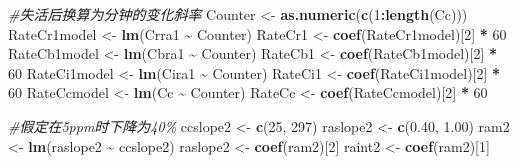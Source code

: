 \documentclass[
]{krantz}
\makeatletter
\newenvironment{Shaded}{\begin{snugshade}}{\end{snugshade}}
\newcommand{\CommentTok}[1]{\textcolor[rgb]{0.56,0.35,0.01}{\textit{#1}}}
\newcommand{\DecValTok}[1]{\textcolor[rgb]{0.00,0.00,0.81}{#1}}
\newcommand{\FloatTok}[1]{\textcolor[rgb]{0.00,0.00,0.81}{#1}}
\newcommand{\KeywordTok}[1]{\textcolor[rgb]{0.13,0.29,0.53}{\textbf{#1}}}
\newcommand{\NormalTok}[1]{#1}
\newcommand{\OperatorTok}[1]{\textcolor[rgb]{0.81,0.36,0.00}{\textbf{#1}}}
\newcommand{\StringTok}[1]{\textcolor[rgb]{0.31,0.60,0.02}{#1}}
\newenvironment{kframe}{%
\medskip{}
\setlength{\fboxsep}{.8em}
 \def\at@end@of@kframe{}%
 \ifinner\ifhmode%
  \def\at@end@of@kframe{\end{minipage}}%
  \begin{minipage}{\columnwidth}%
 \fi\fi%
 \def\FrameCommand##1{\hskip\@totalleftmargin \hskip-\fboxsep
 \colorbox{shadecolor}{##1}\hskip-\fboxsep
     \hskip-\linewidth \hskip-\@totalleftmargin \hskip\columnwidth}%
 \MakeFramed {\advance\hsize-\width
   \@totalleftmargin\z@ \linewidth\hsize
   \@setminipage}}%
 {\par\unskip\endMakeFramed%
 \at@end@of@kframe}
\renewenvironment{Shaded}{\begin{kframe}}{\end{kframe}}
\makeatother
\begin{document}
\begin{Shaded}
\begin{Highlighting}[]
\CommentTok{\#失活后换算为分钟的变化斜率}
\NormalTok{Counter \textless{}{-}}\StringTok{ }\KeywordTok{as.numeric}\NormalTok{(}\KeywordTok{c}\NormalTok{(}\DecValTok{1}\OperatorTok{:}\KeywordTok{length}\NormalTok{(Cc)))}
\NormalTok{RateCr1model \textless{}{-}}\StringTok{ }\KeywordTok{lm}\NormalTok{(Crra1 }\OperatorTok{\textasciitilde{}}\StringTok{ }\NormalTok{Counter)}
\NormalTok{RateCr1 \textless{}{-}}\StringTok{ }\KeywordTok{coef}\NormalTok{(RateCr1model)[}\DecValTok{2}\NormalTok{] }\OperatorTok{*}\StringTok{ }\DecValTok{60}
\NormalTok{RateCb1model \textless{}{-}}\StringTok{ }\KeywordTok{lm}\NormalTok{(Cbra1 }\OperatorTok{\textasciitilde{}}\StringTok{ }\NormalTok{Counter)}
\NormalTok{RateCb1 \textless{}{-}}\StringTok{ }\KeywordTok{coef}\NormalTok{(RateCb1model)[}\DecValTok{2}\NormalTok{] }\OperatorTok{*}\StringTok{ }\DecValTok{60}
\NormalTok{RateCi1model \textless{}{-}}\StringTok{ }\KeywordTok{lm}\NormalTok{(Cira1 }\OperatorTok{\textasciitilde{}}\StringTok{ }\NormalTok{Counter)}
\NormalTok{RateCi1 \textless{}{-}}\StringTok{ }\KeywordTok{coef}\NormalTok{(RateCi1model)[}\DecValTok{2}\NormalTok{] }\OperatorTok{*}\StringTok{ }\DecValTok{60}
\NormalTok{RateCcmodel \textless{}{-}}\StringTok{ }\KeywordTok{lm}\NormalTok{(Cc }\OperatorTok{\textasciitilde{}}\StringTok{ }\NormalTok{Counter)}
\NormalTok{RateCc \textless{}{-}}\StringTok{ }\KeywordTok{coef}\NormalTok{(RateCcmodel)[}\DecValTok{2}\NormalTok{] }\OperatorTok{*}\StringTok{ }\DecValTok{60}

\CommentTok{\#假定在5ppm时下降为40\%}
\NormalTok{ccslope2 \textless{}{-}}\StringTok{ }\KeywordTok{c}\NormalTok{(}\DecValTok{25}\NormalTok{, }\DecValTok{297}\NormalTok{)}
\NormalTok{raslope2 \textless{}{-}}\StringTok{ }\KeywordTok{c}\NormalTok{(}\FloatTok{0.40}\NormalTok{, }\FloatTok{1.00}\NormalTok{)}
\NormalTok{ram2 \textless{}{-}}\StringTok{ }\KeywordTok{lm}\NormalTok{(raslope2 }\OperatorTok{\textasciitilde{}}\StringTok{ }\NormalTok{ccslope2)}
\NormalTok{raslope2 \textless{}{-}}\StringTok{ }\KeywordTok{coef}\NormalTok{(ram2)[}\DecValTok{2}\NormalTok{]}
\NormalTok{raint2 \textless{}{-}}\StringTok{ }\KeywordTok{coef}\NormalTok{(ram2)[}\DecValTok{1}\NormalTok{]}


\end{Highlighting}
\end{Shaded}
\end{document}
